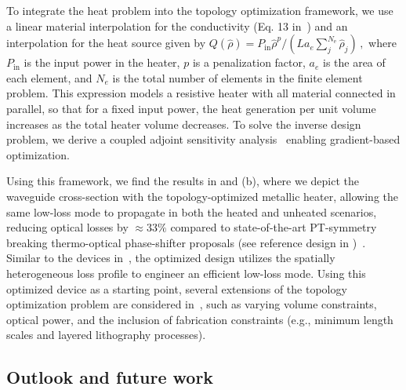  To integrate the heat problem into the 
 topology optimization framework, we use a linear material interpolation 
for the conductivity (Eq. 13 in~\cite{ownpub0}) and an interpolation for the heat source given by $
 Q(\hat{\rho})=P_{\text{in}} \hat{\rho}^p / \left( L a_e \sum^{N_\text{e}}_j \hat{\rho}_j \right)\,,
$
where $P_\text{in}$ is the input power in the heater, $p$ is a penalization factor, $a_e$ is the area of each element, and 
$N_e$ is the total number of elements in the finite element problem. 
This expression models a resistive heater with all material connected in parallel, so that for a fixed input power, the heat 
generation per unit volume increases as the total heater volume decreases.
To solve the inverse design
problem, we derive a coupled adjoint sensitivity analysis~\cite{ownpub0} enabling gradient-based optimization.

Using this framework, we find the results in  and  (b), where we depict the waveguide cross-section with the topology-optimized metallic heater,
allowing the same low-loss mode to propagate in both the heated and unheated scenarios,
reducing optical losses by $\approx 33 \%$ compared to state-of-the-art PT-symmetry breaking thermo-optical phase-shifter proposals (see reference design in )~\cite{lipson}. Similar to the devices
in~\cite{lipson}, the optimized design utilizes the spatially heterogeneous loss profile to engineer an efficient low-loss mode. Using this optimized device as a starting point, several extensions of the topology optimization problem are considered in~\cite{ownpub0}, such as varying volume constraints, optical power, and the inclusion of fabrication constraints (e.g., minimum length scales and layered 
lithography processes).

\subsection*{Outlook and future work}


